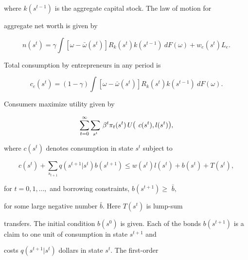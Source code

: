 \documentclass[fleqn,leqno,11pt]{article}
\begin{document}
where $k(s^{t-1})$ is the aggregate capital stock. The law of motion for

aggregate net worth is given by



\begin{equation}

n(s^{t})=\gamma \int \left[ \omega -\bar{\omega}(s^{t})\right]

R_{k}(s^{t})k(s^{t-1})~dF(\omega )+w_{e}(s^{t})L_{e}.  \label{n}

\end{equation}

Total consumption by entrepreneurs in any period is 

\begin{equation}

c_{e}(s^{t})=(1-\gamma )\int \left[ \omega -\bar{\omega}(s^{t})\right]

R_{k}(s^{t})k(s^{t-1})~dF(\omega ).  \label{ce}

\end{equation}



Consumers maximize utility given by 

\begin{equation}

\sum_{t=0}^{\infty }\sum_{s^{t}}\,\beta ^{t}\pi _{t}(s^{t})\,U\text{{\large (%

}}c(s^{t}),l(s^{t})\text{{\large )}},  \label{utility}

\end{equation}%

where $c(s^{t})$ denotes consumption in state $s^{t}$ subject to 

\begin{equation}

c(s^{t})+\sum_{s_{t+1}}q(s^{t+1}|s^{t})b(s^{t+1})\leq

w(s^{t})l(s^{t})+b(s^{t})+T(s^{t}),  \nonumber

\end{equation}%

for $t=0,1,\ldots ,$ and borrowing constraints, $b(s^{t+1})\geq $ $\bar{b},$

for some large negative number $\bar{b}.$ Here $T(s^{t})$ is lump-sum

transfers. The initial condition $b(s^{0})$ is given. Each of the bonds $%

b(s^{t+1})$ is a claim to one unit of consumption in state $s^{t+1}$ and

costs $q(s^{t+1}|s^{t})$ dollars in state $s^{t}.$ The first-order
\end{document}
